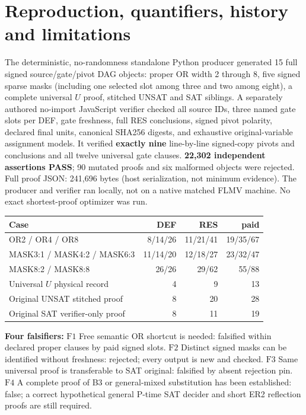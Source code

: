 \documentclass[11pt]{article}
\begin{document}
\section*{Reproduction, quantifiers, history and limitations}
The deterministic, no-randomness standalone Python producer generated 15 full signed source/gate/pivot DAG objects: proper OR width 2 through 8, five signed sparse masks (including one selected slot among three and two among eight), a complete universal \(U\) proof, stitched UNSAT and SAT siblings. A separately authored no-import JavaScript verifier checked all source IDs, three named gate slots per DEF, gate freshness, full RES conclusions, signed pivot polarity, declared final units, canonical SHA256 digests, and exhaustive original-variable assignment models. It verified \textbf{exactly nine} line-by-line signed-copy pivots and conclusions and all twelve universal gate clauses. \textbf{22,302 independent assertions PASS}; 90 mutated proofs and six malformed objects were rejected. Full proof JSON: 241,696 bytes (host serialization, not minimum evidence). The producer and verifier ran locally, not on a native matched FLMV machine. No exact shortest-proof optimizer was run.

\begin{center}\begin{tabular}{lrrr}\toprule
Case & DEF & RES & paid\\\midrule
OR2 / OR4 / OR8 & 8/14/26 & 11/21/41 & 19/35/67\\
MASK3:1 / MASK4:2 / MASK6:3 & 11/14/20 &12/18/27&23/32/47\\
MASK8:2 / MASK8:8 &26/26&29/62&55/88\\
Universal \(U\) physical record &4&9&13\\
Original UNSAT stitched proof &8&20&28\\
Original SAT verifier-only proof &8&11&19\\\bottomrule
\end{tabular}\end{center}

\noindent\textbf{Four falsifiers:} \(\mathrm{F1}\) Free semantic OR shortcut is needed: falsified within declared proper clauses by paid signed slots. \(\mathrm{F2}\) Distinct signed masks can be identified without freshness: rejected; every output is new and checked. \(\mathrm{F3}\) Same universal proof is transferable to SAT original: falsified by absent rejection pin. \(\mathrm{F4}\) A complete proof of B3 or general-mixed substitution has been established: false; a correct hypothetical general P-time SAT decider and short ER2 reflection proofs are still required.
\end{document}
